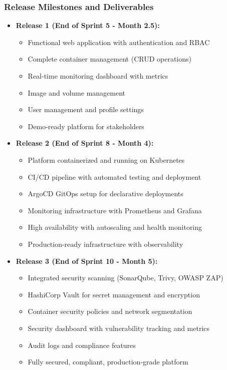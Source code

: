 \subsubsection{Release Milestones and Deliverables}
\begin{itemize}
    \item \textbf{Release 1 (End of Sprint 5 - Month 2.5):}
    \begin{itemize}
        \item Functional web application with authentication and RBAC
        \item Complete container management (CRUD operations)
        \item Real-time monitoring dashboard with metrics
        \item Image and volume management
        \item User management and profile settings
        \item Demo-ready platform for stakeholders
    \end{itemize}
    
    \item \textbf{Release 2 (End of Sprint 8 - Month 4):}
    \begin{itemize}
        \item Platform containerized and running on Kubernetes
        \item CI/CD pipeline with automated testing and deployment
        \item ArgoCD GitOps setup for declarative deployments
        \item Monitoring infrastructure with Prometheus and Grafana
        \item High availability with autoscaling and health monitoring
        \item Production-ready infrastructure with observability
    \end{itemize}
    
    \item \textbf{Release 3 (End of Sprint 10 - Month 5):}
    \begin{itemize}
        \item Integrated security scanning (SonarQube, Trivy, OWASP ZAP)
        \item HashiCorp Vault for secret management and encryption
        \item Container security policies and network segmentation
        \item Security dashboard with vulnerability tracking and metrics
        \item Audit logs and compliance features
        \item Fully secured, compliant, production-grade platform
    \end{itemize}
\end{itemize}

